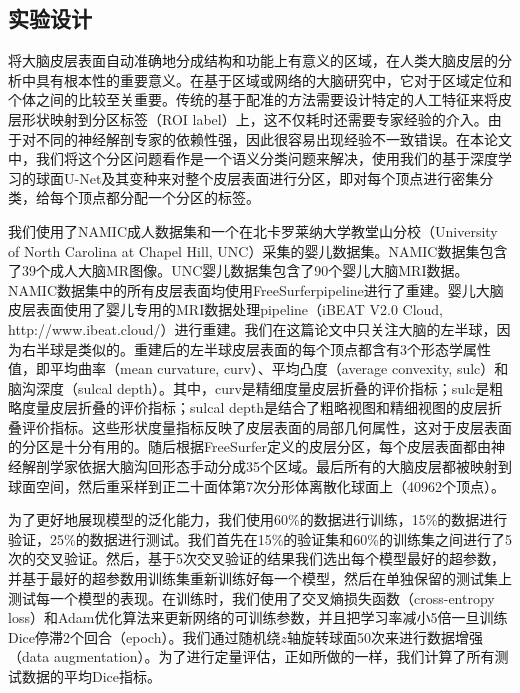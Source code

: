 \subsection{实验设计}\label{sec:大脑皮层分区实验实验设计}
将大脑皮层表面自动准确地分成结构和功能上有意义的区域，在人类大脑皮层的分析中具有根本性的重要意义\cite{meng2015automatic}。在基于区域或网络的大脑研究中，它对于区域定位和个体之间的比较至关重要。传统的基于配准的方法\cite{meng2015automatic,yeo2009spherical,fischl2004automatically}需要设计特定的人工特征来将皮层形状映射到分区标签（ROI label）上，这不仅耗时还需要专家经验的介入。由于对不同的神经解剖专家的依赖性强，因此很容易出现经验不一致错误。在本论文中，我们将这个分区问题看作是一个语义分类问题来解决，使用我们的基于深度学习的球面U-Net及其变种来对整个皮层表面进行分区，即对每个顶点进行密集分类，给每个顶点都分配一个分区的标签。

我们使用了NAMIC成人数据集\cite{meng2015automatic}和一个在北卡罗莱纳大学教堂山分校（University of North Carolina at Chapel Hill, UNC）采集的婴儿数据集。NAMIC数据集包含了39个成人大脑MR图像。UNC婴儿数据集包含了90个婴儿大脑MRI数据。NAMIC数据集中的所有皮层表面均使用FreeSurfer\cite{fischl2012freesurfer}pipeline进行了重建。婴儿大脑皮层表面使用了婴儿专用的MRI数据处理pipeline\cite{li2015construction,2014measuring}（iBEAT V2.0 Cloud, http://www.ibeat.cloud/）进行重建。我们在这篇论文中只关注大脑的左半球，因为右半球是类似的。重建后的左半球皮层表面的每个顶点都含有3个形态学属性值，即平均曲率（mean curvature, curv）、平均凸度（average convexity, sulc）和脑沟深度（sulcal depth）。其中，curv是精细度量皮层折叠的评价指标；sulc是粗略度量皮层折叠的评价指标；sulcal depth是结合了粗略视图和精细视图的皮层折叠评价指标。这些形状度量指标反映了皮层表面的局部几何属性，这对于皮层表面的分区是十分有用的\cite{desikan2006automated}。随后根据FreeSurfer定义的皮层分区\cite{desikan2006automated}，每个皮层表面都由神经解剖学家依据大脑沟回形态手动分成35个区域。最后所有的大脑皮层都被映射到球面空间，然后重采样到正二十面体第7次分形体离散化球面上（40962个顶点）。

为了更好地展现模型的泛化能力，我们使用60\%的数据进行训练，15\%的数据进行验证，25\%的数据进行测试。我们首先在15\%的验证集和60\%的训练集之间进行了5次的交叉验证。然后，基于5次交叉验证的结果我们选出每个模型最好的超参数，并基于最好的超参数用训练集重新训练好每一个模型，然后在单独保留的测试集上测试每一个模型的表现。在训练时，我们使用了交叉熵损失函数（cross-entropy loss）和Adam优化算法\cite{kingma2014adam}来更新网络的可训练参数，并且把学习率减小5倍一旦训练Dice停滞2个回合（epoch）。我们通过随机绕$z$轴旋转球面50次来进行数据增强（data augmentation）。为了进行定量评估，正如\cite{yeo2009spherical}所做的一样，我们计算了所有测试数据的平均Dice\cite{dice1945measures}指标。

